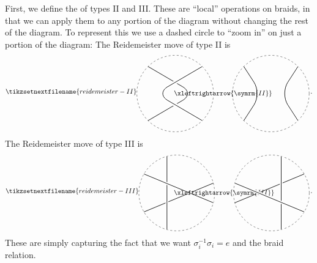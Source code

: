 \documentclass[fleqn]{NotesClass}
\begin{document}
    First, we define the  of types II and III.
    These are \enquote{local} operations on braids, in that we can apply them to any portion of the diagram without changing the rest of the diagram.
    To represent this we use a dashed circle to \enquote{zoom in} on just a portion of the diagram:
    The Reidemeister move of type II is
    \begin{equation}
        \tikzsetnextfilename{reidemeister-II}
        \begin{tikzpicture}[baseline=(current bounding box)]
            \draw [dashed] (0, 0) circle [radius=2];
            \draw [thick, rounded corners=20] (135:2) -- (1, 0) -- (-135:2);
            \draw [line width=2mm, white, rounded corners=20] (45:2) -- (-1, 0) -- (-45:2);
            \draw [thick, rounded corners=20] (45:2) -- (-1, 0) -- (-45:2);
            \node at (2.5, 0) {\(\xleftrightarrow{\symrm{II}}\)};
            \begin{scope}[xshift=5cm]
                \draw [dashed] (0, 0) circle [radius=2];
                \draw [thick, rounded corners=20] (135:2) -- (-0.5, 0) -- (-135:2);
                \draw [line width=1.5mm, white, rounded corners=20] (45:2) -- (0.5, 0) -- (-45:2);
                \draw [thick, rounded corners=20] (45:2) -- (0.5, 0) -- (-45:2);
            \end{scope}
        \end{tikzpicture}
        \,.
    \end{equation}
    The Reidemeister move of type III is
    \begin{equation}
        \tikzsetnextfilename{reidemeister-III}
        \begin{tikzpicture}[baseline=(current bounding box)]
            \draw [dashed] (0, 0) circle [radius=2];
            \draw [thick] (pi/12 r:2) -- (14*pi/12 r:2);
            \draw [line width=1.5mm, white] (7*pi/12 r:2) -- (17*pi/12 r:2);
            \draw [thick] (7*pi/12 r:2) -- (17*pi/12 r:2);
            \draw [line width=1.5mm, white] (10*pi/12 r:2) -- (23*pi/12 r:2);
            \draw [thick] (10*pi/12 r:2) -- (23*pi/12 r:2);
            \node at (2.5, 0) {\(\xleftrightarrow{\symrm{III}}\)};
            \begin{scope}[xshift=5cm]
                \draw [dashed] (0, 0) circle [radius=2];
                \draw [thick] (13*pi/12 r:2) -- (2*pi/12 r:2);
                \draw [line width=1.5mm, white] (5*pi/12 r:2) -- (19*pi/12 r:2);
                \draw [thick] (5*pi/12 r:2) -- (19*pi/12 r:2);
                \draw [line width=1.5mm, white] (11*pi/12 r:2) -- (22*pi/12 r:2);
                \draw [thick] (11*pi/12 r:2) -- (22*pi/12 r:2);
            \end{scope}
        \end{tikzpicture}
        \,.
    \end{equation}
    These are simply capturing the fact that we want \(\sigma_i^{-1} \sigma_i = e\) and the braid relation.
    
\end{document}
